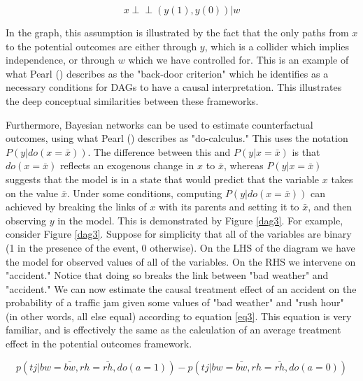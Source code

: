 \documentclass{article}
\begin{document}
\begin{equation}
  x \perp \!\!\! \perp  (y(1), y(0)) | w
\end{equation}

In the graph, this assumption is illustrated by the fact that the only paths from $x$ to the potential outcomes are either through $y$, which is a collider which implies independence, or through $w$ which we have controlled for. This is an example of what Pearl (\citeyear{pearl2018book}) describes as the "back-door criterion" which he identifies as a necessary conditions for DAGs to have a causal interpretation. This illustrates the deep conceptual similarities between these frameworks.

Furthermore, Bayesian networks can be used to estimate counterfactual outcomes, using what Pearl (\citeyear{pearl2014probabilistic}) describes as "do-calculus." This uses the notation $P(y|do(x=\bar{x}))$. The difference between this and $P(y|x=\bar{x})$ is that $do(x=\bar{x})$ reflects an exogenous change in $x$ to $\bar{x}$, whereas $P(y|x=\bar{x})$ suggests that the model is in a state that would predict that the variable $x$ takes on the value $\bar{x}$. Under some conditions, computing $P(y|do(x=\bar{x}))$ can achieved by breaking the links of $x$ with its parents and setting it to $\bar{x}$, and then observing $y$ in the model. This is demonstrated by Figure \ref{dag3}. For example, consider Figure \ref{dag3}. Suppose for simplicity that all of the variables are binary (1 in the presence of the event, 0 otherwise). On the LHS of the diagram we have the model for observed values of all of the variables. On the RHS we intervene on "accident." Notice that doing so breaks the link between "bad weather" and "accident." We can now estimate the causal treatment effect of an accident on the probability of a traffic jam given some values of "bad weather" and "rush hour" (in other words, all else equal) according to equation \ref{eq3}. This equation is very familiar, and is effectively the same as the calculation of an average treatment effect in the potential outcomes framework.

\begin{equation}
  \label{eq3}
  p(tj | bw = \bar{bw}, rh = \bar{rh}, do(a=1)) - p(tj | bw = \bar{bw}, rh = \bar{rh}, do(a=0))
\end{equation}
\end{document}
